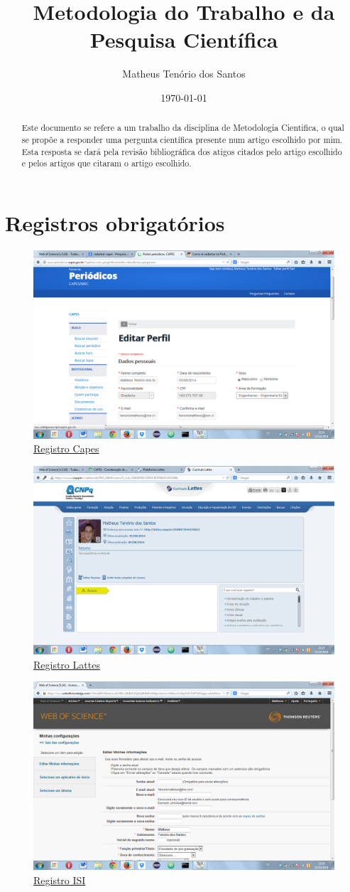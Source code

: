 \documentclass[a4paper]{article}
\title{Metodologia do Trabalho e da Pesquisa Científica}
\author{Matheus Tenório dos Santos}
\date{\today}
\begin{document}
\maketitle


\begin{abstract}

Este documento se refere a um trabalho da disciplina de Metodologia Cientifica, o qual se propõe a responder uma pergunta científica presente num artigo escolhido por mim. Esta resposta se dará pela revisão bibliográfica dos atigos citados pelo artigo escolhido e pelos artigos que citaram o artigo escolhido.

\end{abstract}


\section{Registros obrigatórios}


\begin{figure}[!h]
	\centering
	\includegraphics[width=.3\linewidth]{capes.png}
	\caption{\href{./capes.png}{Registro Capes}}
	\label{fig:capes}
\end{figure}

\begin{figure}[!h]
	\centering
  	\includegraphics[width=.3\linewidth]{lattes.png}
  	\caption{\href{./lattes.png}{Registro Lattes}}
  	\label{fig:lattes}
\end{figure}

\begin{figure}[!h]
	\centering
	\includegraphics[width=.3\linewidth]{ISI.png}
	\caption{\href{./ISI.png}{Registro ISI}}
	\label{fig:ISI}
\end{figure}
\end{document}
